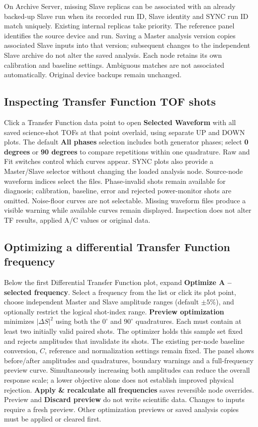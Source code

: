 \documentclass[11pt,oneside,openany]{book}
\newcommand{\ui}[1]{\textbf{#1}}
\begin{document}
On Archive Server, missing Slave replicas can be associated with an already backed-up
Slave run when its recorded run ID, Slave identity and SYNC run ID match uniquely.
Existing internal replicas take priority. The reference panel identifies the source device
and run. Saving a Master analysis version copies associated Slave inputs into that version;
subsequent changes to the independent Slave archive do not alter the saved analysis.
Each node retains its own calibration and baseline settings. Ambiguous matches are not
associated automatically. Original device backups remain unchanged.

\subsection{Inspecting Transfer Function TOF shots}
Click a Transfer Function data point to open \ui{Selected Waveform} with all saved
science-shot TOFs at that point overlaid, using separate UP and DOWN plots. The default
\ui{All phases} selection includes both generator phases; select \ui{0 degrees} or
\ui{90 degrees} to compare repetitions within one quadrature. Raw and Fit switches
control which curves appear. SYNC plots also provide a Master/Slave selector without
changing the loaded analysis node. Source-node waveform indices select the files.
Phase-invalid shots remain available for diagnosis; calibration, baseline, error and rejected
power-monitor shots are omitted. Noise-floor curves are not selectable. Missing waveform
files produce a visible warning while available curves remain displayed. Inspection does
not alter TF results, applied A/C values or original data.

\subsection{Optimizing a differential Transfer Function frequency}
Below the first Differential Transfer Function plot, expand \ui{Optimize A -- selected frequency}.
Select a frequency from the list or click its plot point, choose independent Master and Slave
amplitude ranges (default $\pm5\%$), and optionally restrict the logical shot-index range.
\ui{Preview optimization} minimizes $|\Delta S|^2$ using both the $0^\circ$ and $90^\circ$
quadratures. Each must contain at least two initially valid paired shots. The optimizer
holds this sample set fixed and rejects amplitudes that invalidate its shots. The existing
per-node baseline conversion, $C$, reference and normalization settings remain fixed.
The panel shows before/after amplitudes and quadratures, boundary warnings and a full-frequency
preview curve. Simultaneously increasing both amplitudes can reduce the overall response
scale; a lower objective alone does not establish improved physical rejection.
\ui{Apply \& recalculate all frequencies} saves reversible node overrides. Preview and
\ui{Discard preview} do not write scientific data. Changes to inputs require a fresh preview.
Other optimization previews or saved analysis copies must be applied or cleared first.
\end{document}
